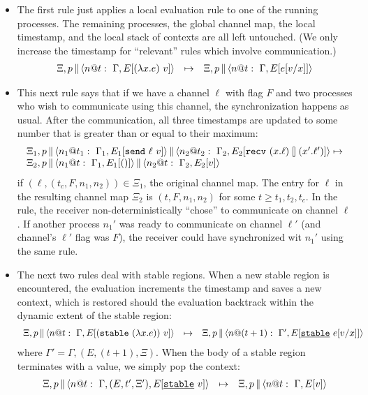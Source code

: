 \documentclass{article}
\begin{document}
\begin{itemize}
\item The first rule just applies a local evaluation rule to one of the
  running processes. The remaining processes, the global channel map, the
  local timestamp, and the local stack of contexts are all left
  untouched. (We only increase the timestamp for ``relevant'' rules which
  involve communication.)
\[\begin{array}{rcl}
  \Xi,\parc{p}{\proc{n}{\Gamma}{E[(\lambda x.e)~v]}{t}} &\mapsto& 
  \Xi,\parc{p}{\proc{n}{\Gamma}{E[e[v/x]]}{t}}
\end{array}\]

\item This next rule says that if we have a channel $\ell$ with flag $F$ and
  two processes who wish to communicate using this channel, the
  synchronization happens as usual. After the communication, all three
  timestamps are updated to some number that is greater than or equal to
  their maximum:
\[\begin{array}{l}
  \Xi_1,\parc{p}
  {\parc{\proc{n_1}{\Gamma_1}{E_1[\send{\ell}{v}]}{t_1}}
        {\proc{n_2}{\Gamma_2}{E_2[\recv{x}{\ell}{x'}{\ell'}]}{t_2}}}
  \mapsto \\
  \Xi_2,\parc{p}{\parc{\proc{n_1}{\Gamma_1}{E_1[()]}{t}}
    {\proc{n_2}{\Gamma_2}{E_2[v]}{t}}}
\end{array}\]
if $(\ell,(t_{c},F,n_1,n_2)) \in \Xi_1$, the original channel map.  The entry
for $\ell$ in the resulting channel map $\Xi_2$ is $(t,F,n_1,n_2)$ for some
$t \geq t_1, t_2, t_c$. In the rule, the receiver non-deterministically
``chose'' to communicate on channel $\ell$. If another process $n_1'$ was
ready to communicate on channel $\ell'$ (and channel's $\ell'$ flag was $F$),
the receiver could have synchronized wit $n_1'$ using the same rule.

\item The next two rules deal with stable regions. When a new stable region
  is encountered, the evaluation increments the timestamp and saves a new
  context, which is restored should the evaluation backtrack within the
  dynamic extent of the stable region:
\[\begin{array}{rcl}
  \Xi,\parc{p}{\proc{n}{\Gamma}{E[(\stable{(\lambda x.e)})~v]}{t}} &\mapsto&
  \Xi,\parc{p}{\proc{n}{\Gamma'}{E[\stableu{e[v/x]}]}{(t+1)}} 
\end{array}\]
where $\Gamma' = \Gamma,(E,(t+1),\Xi)$. When the body of a stable 
region terminates with a value, we simply pop the context:
\[\begin{array}{rcl}
  \Xi,\parc{p}{\proc{n}{\Gamma,(E,t',\Xi')}{E[\stableu{v}]}{t}} 
  &\mapsto& 
  \Xi,\parc{p}{\proc{n}{\Gamma}{E[v]}{t}} 
\end{array}\]


\end{itemize}
\end{document}
